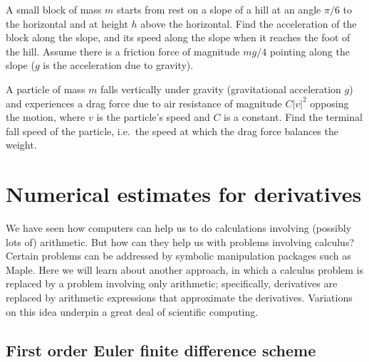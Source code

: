 \vspace{3mm}
\noindent \theexamplecounter
\label{Q:6.2}
A small block of mass $m$  starts from rest on a slope of a hill
at an angle $\pi/6$ to the horizontal and at height $h$ above 
the horizontal. Find the acceleration of the block along the slope, 
and its speed along the slope when it reaches the foot of the hill. 
Assume there is a friction force of magnitude $mg/4$ pointing along the slope 
($g$ is the acceleration due to gravity).


\vspace{3mm}
\noindent \theexamplecounter
\label{Q:6.3}
A particle of mass $m$ falls vertically under gravity (gravitational
acceleration $g$) and experiences a drag force due to air resistance
of magnitude $C |v|^2$ opposing the motion, where $v$
is the particle's speed and $C$ is a constant. Find the
terminal fall speed of the particle, i.e.\ the speed at which the
drag force balances the weight.


\section{Numerical estimates for derivatives}

We have seen how computers can help us to do calculations involving
(possibly lots of) arithmetic. But how can they help us with
problems involving calculus? Certain problems can be addressed
by symbolic manipulation packages such as Maple. Here we will learn
about another approach, in which a calculus problem is replaced
by a problem involving only arithmetic; specifically, derivatives are
replaced by arithmetic expressions that approximate the derivatives.
Variations on this idea underpin a great deal of scientific computing.

\subsection{First order Euler finite difference scheme}

